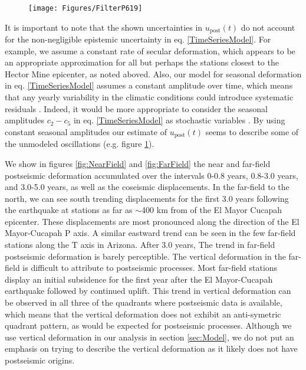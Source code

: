 \documentclass[1p]{elsarticle}
\begin{document}
\begin{figure}
\texttt{[image: Figures/FilterP619]}
\centering
\caption{} 
\label{fig:P619}
\end{figure}

It is important to note that the shown uncertainties in $u_\mathrm{post}(t)$ do not account for the non-negligible epistemic uncertainty in eq. \ref{TimeSeriesModel}.  For example, we assume a constant rate of secular deformation, which appears to be an appropriate approximation for all but perhaps the stations closest to the Hector Mine epicenter, as noted aboved.  Also, our model for seasonal deformation in eq. \ref{TimeSeriesModel} assumes a constant amplitude over time, which means that any yearly variability in the climatic conditions could introduce systematic residuals \citep{Davis2012}. Indeed, it would be more appropriate to consider the seasonal amplitudes $c_2-c_5$ in eq. \ref{TimeSeriesModel} as stochastic variables \citep{Murray2005}. By using constant seasonal amplitudes our estimate of $u_\mathrm{post}(t)$ seems to describe some of the unmodeled oscillations (e.g. figure \ref{fig:P619}).          

We show in figures \ref{fig:NearField} and \ref{fig:FarField} the near and far-field postseismic deformation accumulated over the intervals  0-0.8 years, 0.8-3.0 years, and 3.0-5.0 years, as well as the coseismic displacements.  In the far-field to the north, we can see south trending displacements for the first 3.0 years following the earthquake at stations as far as $\sim$400 km from of the El Mayor Cucapah epicenter.  These displacements are most pronounced along the direction of the El Mayor-Cucapah P axis. A similar eastward trend can be seen in the few far-field stations along the T axis in Arizona.  After 3.0 years, The trend in far-field postseismic deformation is barely perceptible.  The vertical deformation in the far-field is difficult to attribute to postseismic processes.  Most far-field stations display an initial subsidence for the first year after the El Mayor-Cucapah earthquake followed by continued uplift.  This trend in vertical deformation can be observed in all three of the quadrants where postseismic data is available, which means that the vertical deformation does not exhibit an anti-symetric quadrant pattern, as would be expected for postseismic processes.  Although we use vertical deformation in our analysis in section \ref{sec:Model},  we do not put an emphasis on trying to describe the vertical deformation as it likely does not have postseismic origins.        
\end{document}
